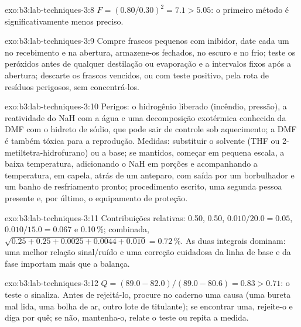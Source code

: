 \begin{solution}{exo:b3:lab-techniques-3:8}
$F = (0.80/0.30)^2 = 7.1 > 5.05$: o primeiro método é significativamente menos preciso.
\end{solution}

\begin{solution}{exo:b3:lab-techniques-3:9}
Compre frascos pequenos com inibidor, date cada um no recebimento e na abertura, armazene-os
fechados, no escuro e no frio; teste os peróxidos antes de qualquer destilação ou evaporação
e a intervalos fixos após a abertura; descarte os frascos vencidos, ou com teste
positivo, pela rota de resíduos perigosos, sem concentrá-los.
\end{solution}

\begin{solution}{exo:b3:lab-techniques-3:10}
Perigos: o hidrogênio liberado (incêndio, pressão), a reatividade do NaH com a água
e uma decomposição exotérmica conhecida da DMF com o hidreto de sódio, que pode sair de controle
sob aquecimento; a DMF é também tóxica para a reprodução. Medidas: substituir o solvente
(THF ou 2-metiltetra-hidrofurano) ou a base; se mantidos, começar em pequena escala, a baixa
temperatura, adicionando o NaH em porções e acompanhando a temperatura, em capela,
atrás de um anteparo, com saída por um borbulhador e um banho de resfriamento pronto; procedimento
escrito, uma segunda pessoa presente e, por último, o equipamento de proteção.
\end{solution}

\begin{solution}{exo:b3:lab-techniques-3:11}
Contribuições relativas: 0.50, 0.50, $0.010/20.0 = 0.05$, $0.010/15.0 = 0.067$ e 0.10\,\%; combinada,
$\sqrt{0.25 + 0.25 + 0.0025 + 0.0044 + 0.010} = 0.72$\,\%. As duas integrais dominam: uma melhor relação sinal/ruído e uma
correção cuidadosa da linha de base e da fase importam mais que a balança.
\end{solution}

\begin{solution}{exo:b3:lab-techniques-3:12}
$Q = (89.0 - 82.0)/(89.0 - 80.6) = 0.83 > 0.71$: o teste o sinaliza. Antes de rejeitá-lo, procure no caderno
uma causa (uma bureta mal lida, uma bolha de ar, outro lote de titulante); se encontrar uma,
rejeite-o e diga por quê; se não, mantenha-o, relate o teste ou repita a
medida.
\end{solution}


